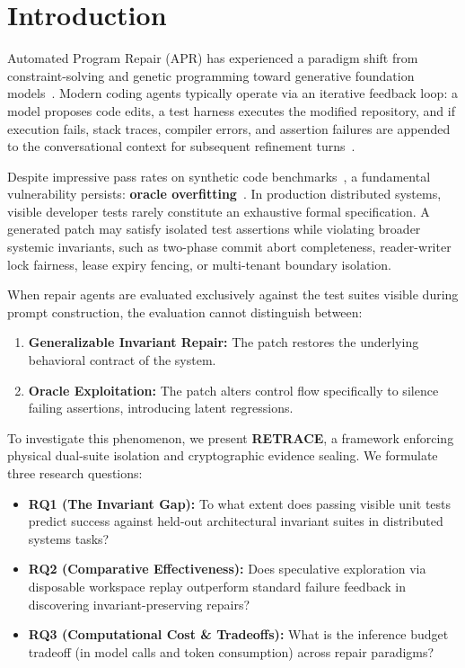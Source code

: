 \documentclass[10pt,twocolumn,letterpaper]{article}
\begin{document}
\section{Introduction}

Automated Program Repair (APR) has experienced a paradigm shift from constraint-solving and genetic programming toward generative foundation models~\cite{fan2023automated,legoues2012genprog}. Modern coding agents typically operate via an iterative feedback loop: a model proposes code edits, a test harness executes the modified repository, and if execution fails, stack traces, compiler errors, and assertion failures are appended to the conversational context for subsequent refinement turns~\cite{xia2023keep,shinn2023reflexion}.

Despite impressive pass rates on synthetic code benchmarks~\cite{jimenez2024swebench}, a fundamental vulnerability persists: \textbf{oracle overfitting}~\cite{smith2015cure}. In production distributed systems, visible developer tests rarely constitute an exhaustive formal specification. A generated patch may satisfy isolated test assertions while violating broader systemic invariants, such as two-phase commit abort completeness, reader-writer lock fairness, lease expiry fencing, or multi-tenant boundary isolation.

When repair agents are evaluated exclusively against the test suites visible during prompt construction, the evaluation cannot distinguish between:
\begin{enumerate}
    \item \textbf{Generalizable Invariant Repair:} The patch restores the underlying behavioral contract of the system.
    \item \textbf{Oracle Exploitation:} The patch alters control flow specifically to silence failing assertions, introducing latent regressions.
\end{enumerate}

To investigate this phenomenon, we present \textbf{RETRACE}, a framework enforcing physical dual-suite isolation and cryptographic evidence sealing. We formulate three research questions:
\begin{itemize}
    \item \textbf{RQ1 (The Invariant Gap):} To what extent does passing visible unit tests predict success against held-out architectural invariant suites in distributed systems tasks?
    \item \textbf{RQ2 (Comparative Effectiveness):} Does speculative exploration via disposable workspace replay outperform standard failure feedback in discovering invariant-preserving repairs?
    \item \textbf{RQ3 (Computational Cost \& Tradeoffs):} What is the inference budget tradeoff (in model calls and token consumption) across repair paradigms?
\end{itemize}
\end{document}
